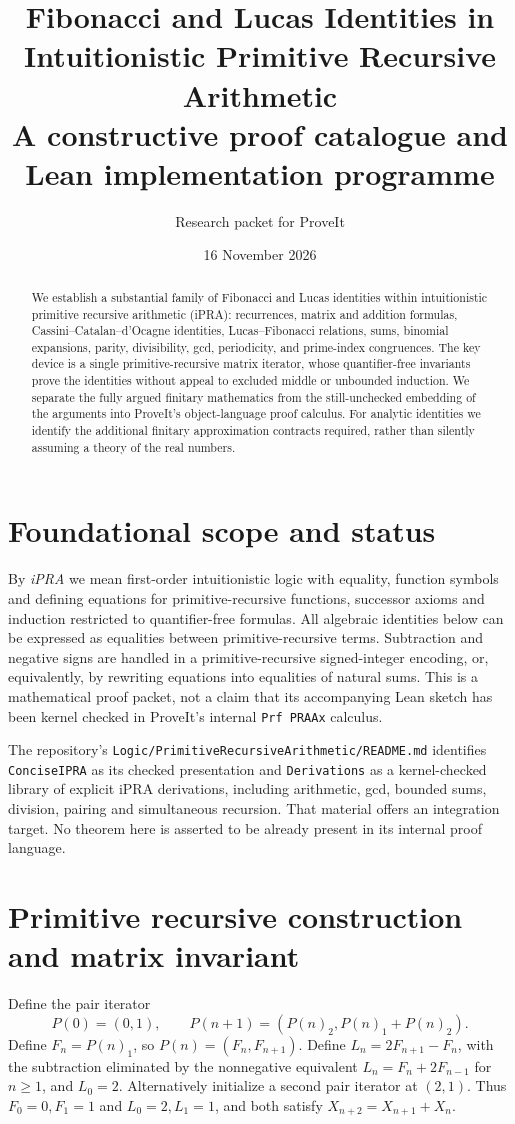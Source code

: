 \documentclass[11pt]{article}
\title{Fibonacci and Lucas Identities in Intuitionistic Primitive Recursive Arithmetic\\\large A constructive proof catalogue and Lean implementation programme}
\author{Research packet for ProveIt}\date{16 November 2026}
\begin{document}
\maketitle
\begin{abstract}
We establish a substantial family of Fibonacci and Lucas identities within intuitionistic primitive recursive arithmetic (iPRA): recurrences, matrix and addition formulas, Cassini--Catalan--d'Ocagne identities, Lucas--Fibonacci relations, sums, binomial expansions, parity, divisibility, gcd, periodicity, and prime-index congruences. The key device is a single primitive-recursive matrix iterator, whose quantifier-free invariants prove the identities without appeal to excluded middle or unbounded induction. We separate the fully argued finitary mathematics from the still-unchecked embedding of the arguments into ProveIt's object-language proof calculus. For analytic identities we identify the additional finitary approximation contracts required, rather than silently assuming a theory of the real numbers.
\end{abstract}
\tableofcontents
\section{Foundational scope and status}
By \emph{iPRA} we mean first-order intuitionistic logic with equality, function symbols and defining equations for primitive-recursive functions, successor axioms and induction restricted to quantifier-free formulas. All algebraic identities below can be expressed as equalities between primitive-recursive terms. Subtraction and negative signs are handled in a primitive-recursive signed-integer encoding, or, equivalently, by rewriting equations into equalities of natural sums. This is a mathematical proof packet, not a claim that its accompanying Lean sketch has been kernel checked in ProveIt's internal \texttt{Prf PRAAx} calculus.

The repository's \texttt{Logic/PrimitiveRecursiveArithmetic/README.md} identifies \texttt{ConciseIPRA} as its checked presentation and \texttt{Derivations} as a kernel-checked library of explicit iPRA derivations, including arithmetic, gcd, bounded sums, division, pairing and simultaneous recursion. That material offers an integration target. No theorem here is asserted to be already present in its internal proof language.

\section{Primitive recursive construction and matrix invariant}
Define the pair iterator
\[P(0)=(0,1),\qquad P(n+1)=(P(n)_2,P(n)_1+P(n)_2).\]
Define $F_n=P(n)_1$, so $P(n)=(F_n,F_{n+1})$. Define $L_n=2F_{n+1}-F_n$, with the subtraction eliminated by the nonnegative equivalent $L_n=F_n+2F_{n-1}$ for $n\ge1$, and $L_0=2$. Alternatively initialize a second pair iterator at $(2,1)$. Thus $F_0=0,F_1=1$ and $L_0=2,L_1=1$, and both satisfy $X_{n+2}=X_{n+1}+X_n$.
\end{document}
